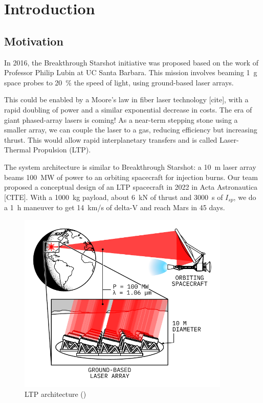 \chapter{Introduction} \label{chp:intro}
    
    \section{Motivation}

        In 2016, the Breakthrough Starshot initiative was proposed based on the work of Professor Philip Lubin at UC Santa Barbara. This mission involves beaming \qty{1}{g} space probes to \qty{20}{\%} the speed of light, using ground-based laser arrays.

        This could be enabled by a Moore's law in fiber laser technology [cite], with a rapid doubling of power and a similar exponential decrease in costs. The era of giant phased-array lasers is coming! As a near-term stepping stone using a smaller array, we can couple the laser to a gas, reducing efficiency but increasing thrust. This would allow rapid interplanetary transfers and is called Laser-Thermal Propulsion (LTP).

        The system architecture is similar to Breakthrough Starshot: a \qty{10}{m} laser array beams \qty{100}{MW} of power to an orbiting spacecraft for injection burns. Our team proposed a conceptual design of an LTP spacecraft in 2022 in Acta Astronautica [CITE]. With a \qty{1000}{kg} payload, about \qty{6}{kN} of thrust and \qty{3000}{s} of $I_{sp}$, we do a \qty{1}{h} maneuver to get \qty{14}{km/s} of delta-V and reach Mars in 45 days.

        \begin{figure}[h!]
            \centering
            \includegraphics[width=0.9\textwidth]{assets/2 background/ltp_architecture.pdf}
            \caption{LTP architecture (\textcite{duplayArgonLaserPlasmaThruster2024a})}
            \label{fig:LTP architecture}
        \end{figure}

